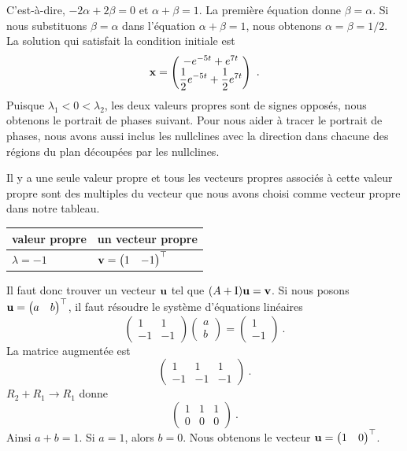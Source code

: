 {\[\]
C'est-à-dire, $-2\alpha + 2\beta = 0$ et $\alpha + \beta =1$.  La première
équation donne $\beta = \alpha$.  Si nous substituons $\beta=\alpha$ dans
l'équation $\alpha + \beta =1$, nous obtenons
$\displaystyle \alpha = \beta = 1/2$.  La solution qui satisfait la
condition initiale est
\[
\mathbf{x} = \begin{pmatrix}
- e^{-5 t} + e^{7t} \\
\displaystyle \frac{1}{2} e^{-5 t} + \frac{1}{2} e^{7t}
\end{pmatrix} \ .
\]
Puisque $\lambda_1 < 0 < \lambda_2$, les deux valeurs propres sont de
signes opposés, nous obtenons le portrait de phases suivant.
Pour nous aider à tracer le portrait de phases, nous avons aussi
inclus les nullclines avec la direction dans chacune des régions
du plan découpées par les nullclines.

 Il y a une seule valeur propre et tous les vecteurs
propres associés à cette valeur propre sont des multiples du vecteur
que nous avons choisi comme vecteur propre dans notre tableau.
\begin{center}
\begin{tabular}{l|l}
valeur propre & un vecteur propre \\
\hline
\rule{0em}{1.4em}
$\lambda = -1$ &
$\displaystyle \mathbf{v} =\begin{pmatrix} 1 & -1 \end{pmatrix}^\top$
\end{tabular}
\end{center}
Il faut donc trouver un vecteur $\mathbf{u}$ tel que $(A+\operatorname{I})\mathbf{u} = \mathbf{v}$.
Si nous posons
$\displaystyle \mathbf{u} = \begin{pmatrix} a & b \end{pmatrix}^\top$, il
faut résoudre le système d'équations linéaires
\[
\begin{pmatrix} 1 & 1 \\ -1 & -1 \end{pmatrix}
\begin{pmatrix} a \\ b \end{pmatrix} =
\begin{pmatrix} 1 \\ -1 \end{pmatrix} \ .
\]
La matrice augmentée est
\[
\left(
\begin{array}{cc|c}
1 & 1 & 1 \\
-1 & -1 & -1
\end{array}\right) \ .
\]
$R_2+R_1 \rightarrow R_1$ donne
\[
\left(
\begin{array}{cc|c}
1 & 1 & 1 \\
0 & 0 & 0
\end{array}\right) \ .
\]
Ainsi $a + b = 1$.  Si $a=1$, alors $b=0$.  Nous obtenons le vecteur
$\displaystyle \mathbf{u} = \begin{pmatrix} 1 & 0 \end{pmatrix}^\top$.

}
